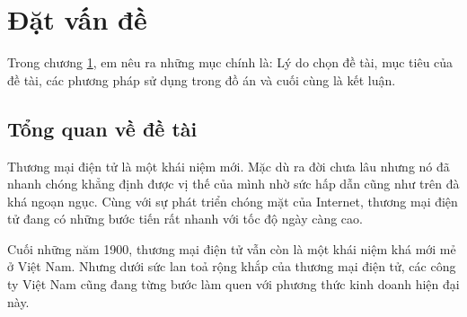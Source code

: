 \chapter{Đặt vấn đề}
\label{chapter1}
Trong chương \ref{chapter1}, em nêu ra những mục chính là: Lý do chọn đề tài, mục tiêu của đề tài, các phương pháp sử dụng trong đồ án và cuối cùng là kết luận.
\section{Tổng quan về đề tài}
Thương mại điện tử là một khái niệm mới. Mặc dù ra đời chưa lâu nhưng nó đã nhanh chóng khẳng định được vị thế của mình nhờ sức hấp dẫn cũng như trên đà khá ngoạn ngục. Cùng với sự phát triển chóng mặt của Internet, thương mại điện tử đang có những bước tiến rất nhanh với tốc độ ngày càng cao.
\par
Cuối những năm 1900, thương mại điện tử vẫn còn là một khái niệm khá mới mẻ ở Việt Nam. Nhưng dưới sức lan toả rộng khắp của thương mại điện tử, các công ty Việt Nam cũng đang từng bước làm quen với phương thức kinh doanh hiện đại này.  
